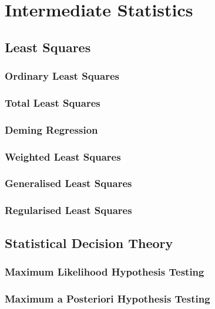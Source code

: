 \documentclass[11pt]{report} %
\begin{document}
\chapter{Intermediate Statistics}

\section{Least Squares}

\subsection{Ordinary Least Squares}

\subsection{Total Least Squares}

\subsection{Deming Regression}

\subsection{Weighted Least Squares}

\subsection{Generalised Least Squares}

\subsection{Regularised Least Squares}

\section{Statistical Decision Theory}

\subsection{Maximum Likelihood Hypothesis Testing}

\subsection{Maximum a Posteriori Hypothesis Testing}
\end{document}
